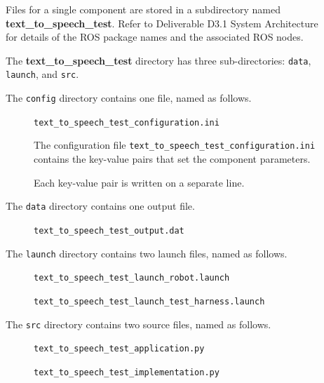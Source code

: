 \documentclass{CSSRforAfrica}
\newcommand{\checkboxChecked}{\fbox{\ding{51}}} %
\newcommand{\checkboxDashed}{\fbox{--}}         %
\begin{document}
\begin{description}

\item[\checkboxChecked] Files for a single component are stored in a subdirectory named \textbf{text\_to\_speech\_test}. Refer to Deliverable D3.1 System Architecture for details of the ROS package names and the associated ROS nodes.

\item[\checkboxChecked] The \textbf{text\_to\_speech\_test} directory has three sub-directories: {\small \verb+data+}, {\small \verb+launch+}, and {\small \verb+src+}.

\item[\checkboxDashed] The  {\small \verb+config+} directory contains one file, named as follows.
\begin{description}
\item[\checkboxDashed] {\small  \texttt{text\_to\_speech\_test\_configuration.ini}}  
\item[\checkboxDashed] The configuration file {\small \verb+text_to_speech_test_configuration.ini+} contains the key-value pairs that set the component parameters.  
\item[\checkboxDashed] Each key-value pair is written on a separate line.
\end{description}

 
\item[\checkboxChecked] The  {\small \texttt{data}} directory contains one output file.
\begin{description} 
\item[\checkboxChecked] {\small \texttt{text\_to\_speech\_test\_output.dat}}
\end{description}

\item[\checkboxChecked] The  {\small \verb+launch+} directory contains two launch files, named as follows.
\begin{description}
\item[\checkboxChecked] {\small \verb+text_to_speech_test_launch_robot.launch+}  
\item[\checkboxChecked]  {\small \verb+text_to_speech_test_launch_test_harness.launch+}  
\end{description}

\item[\checkboxChecked] The  {\small \verb+src+} directory contains two source files, named as follows.
\begin{description}
\item[\checkboxChecked] {\small \verb+text_to_speech_test_application.py+}  
\item[\checkboxChecked]  {\small \verb+text_to_speech_test_implementation.py+}  
\end{description}


\end{description}
\end{document}
